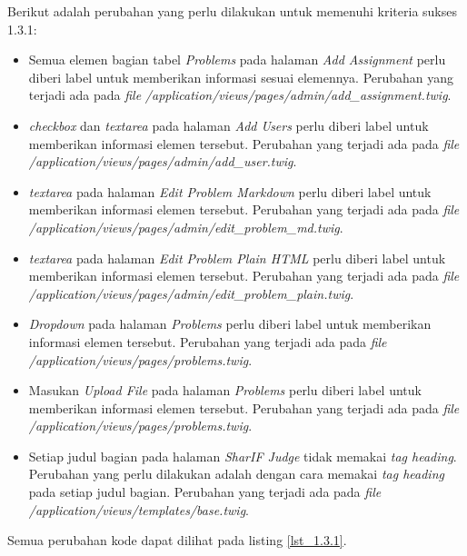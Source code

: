 Berikut adalah perubahan yang perlu dilakukan untuk memenuhi kriteria sukses 1.3.1:

\begin{itemize}
	\item Semua elemen bagian tabel \textit{Problems} pada halaman \textit{Add Assignment} perlu diberi label untuk memberikan informasi sesuai elemennya. Perubahan yang terjadi ada pada \textit{file} \textit{/application/views/pages/admin/add\_assignment.twig}.

	\item \textit{checkbox} dan \textit{textarea} pada halaman \textit{Add Users} perlu diberi label untuk memberikan informasi elemen tersebut. Perubahan yang terjadi ada pada \textit{file} \textit{/application/views/pages/admin/add\_user.twig}.

	\item \textit{textarea} pada halaman \textit{Edit Problem Markdown} perlu diberi label untuk memberikan informasi elemen tersebut. Perubahan yang terjadi ada pada \textit{file} \textit{/application/views/pages/admin/edit\_problem\_md.twig}.

	\item \textit{textarea} pada halaman \textit{Edit Problem Plain HTML} perlu diberi label untuk memberikan informasi elemen tersebut. Perubahan yang terjadi ada pada \textit{file} \textit{/application/views/pages/admin/edit\_problem\_plain.twig}.
	
	\item \textit{Dropdown} pada halaman \textit{Problems} perlu diberi label untuk memberikan informasi elemen tersebut. Perubahan yang terjadi ada pada \textit{file} \textit{/application/views/pages/problems.twig}.

	\item Masukan \textit{Upload File} pada halaman \textit{Problems} perlu diberi label untuk memberikan informasi elemen tersebut. Perubahan yang terjadi ada pada \textit{file} \textit{/application/views/pages/problems.twig}.
	
	\item Setiap judul bagian pada halaman \textit{SharIF Judge} tidak memakai \textit{tag heading}. Perubahan yang perlu dilakukan adalah dengan cara memakai \textit{tag heading} pada setiap judul bagian.
	Perubahan yang terjadi ada pada \textit{file} \textit{/application/views/templates/base.twig}.

\end{itemize}

Semua perubahan kode dapat dilihat pada listing \ref{lst_1.3.1}.

